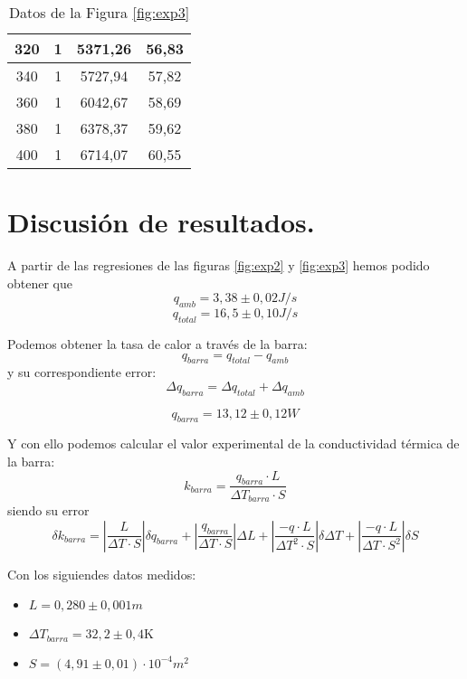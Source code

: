 \documentclass[a4paper,12pt,spanish]{article}
\begin{document}
\begin{table}[H]
\begin{tabular}{|c|c|c|c|}
		320  & 1       & 5371,26           & 56,83           \\ \hline
		340  & 1       & 5727,94           & 57,82           \\ \hline
		360  & 1       & 6042,67           & 58,69           \\ \hline
		380  & 1       & 6378,37           & 59,62           \\ \hline
		400  & 1       & 6714,07           & 60,55           \\ \hline
	\end{tabular}
	\caption{Datos de la Figura \ref{fig:exp3}}
	\label{tab:tab3}
\end{table}


	
	\section{Discusión de resultados.}
	
	\iffalse
	Respuesta razonada a las cuestiones que aparecen en el
	guion de la práctica. Justificación de los resultados. Comparativa de los valores
	experimentales obtenidos con los publicados en la literatura y posibles fuentes de
	incertidumbre en la experimentación que expliquen la discrepancia.
	
	Básicamente comentar los resultados y lo similares que son a lo esperado, comentar las posibles causas de error.
	\fi
	
	A partir de las regresiones de las figuras \ref{fig:exp2} y \ref{fig:exp3} hemos podido obtener que
	\[ q_{amb} = 3,38 \pm 0,02 \si{J/s}
	\]
	\[ q_{total} = 16,5 \pm 0,10\si{J/s}
	\]
	
	Podemos obtener la tasa de calor a través de la barra:
	\[ q_{barra} = q_{total} - q_{amb}
	\]
	y su correspondiente error:
	\[\Delta q_{barra} =\Delta q_{total} + \Delta q_{amb}
	\]
	
	\[\boxed{q_{barra} = 13,12 \pm 0,12 \si{W}}
	\]
	
	Y con ello podemos calcular el valor experimental de la conductividad térmica de la barra:
	\[k_{barra} = \frac{q_{barra}\cdot L}{\Delta T_{barra}\cdot S}
	\]
	siendo su error
	\[\delta k_{barra} = \left|\frac{L}{\Delta T\cdot S}\right|\delta q_{barra} + \left| \frac{q_{barra}}{\Delta T \cdot S} \right|\Delta L +  \left| \frac{-q\cdot L}{\Delta T^2 \cdot S} \right| \delta \Delta T + \left| \frac{-q\cdot L}{\Delta T\cdot S^2} \right| \delta S   \] 
	
	Con los siguiendes datos medidos:
	\begin{itemize}
		\item $L= 0,280 \pm 0,001\si{m}$
		\item $\Delta T_{barra}= 32,2\pm 0,4 \text{K}$
		\item $S = (4,91\pm 0,01)\cdot10^{-4} \si{m^2}$
	\end{itemize}
	
\end{document}
